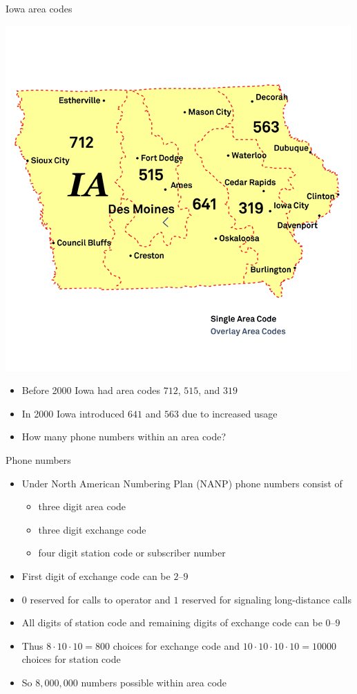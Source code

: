 \documentclass[handout]{beamer}
\theoremstyle{definition}
\begin{document}
\begin{frame}{Iowa area codes}
\begin{multicols}{2}
\includegraphics[scale=.35]{Iowa}
\begin{itemize}
\item Before 2000 Iowa had area codes $712$, $515$, and $319$
\item In 2000 Iowa introduced $641$ and $563$ due to increased usage
\item How many phone numbers within an area code?
\end{itemize}
\end{multicols}
\end{frame}

\begin{frame}{Phone numbers}
\begin{itemize}
\item Under North American Numbering Plan (NANP)
phone numbers consist of 
\begin{itemize}
\item three digit \alert{area code}
\item three digit \alert{exchange code}
\item four digit \alert{station code} or \alert{subscriber number}
\end{itemize}
\item First digit of exchange code can be $2$--$9$
\item $0$ reserved for calls to operator and 
$1$ reserved for signaling long-distance calls
\item All digits of station code and remaining digits
of exchange code can be $0$--$9$
\item Thus $8\cdot 10\cdot 10=800$ choices
for exchange code and $10\cdot 10\cdot 10\cdot 10=10000$
choices for station code
\item So $8,000,000$ numbers possible within area code
\end{itemize}
\end{frame}
\end{document}
